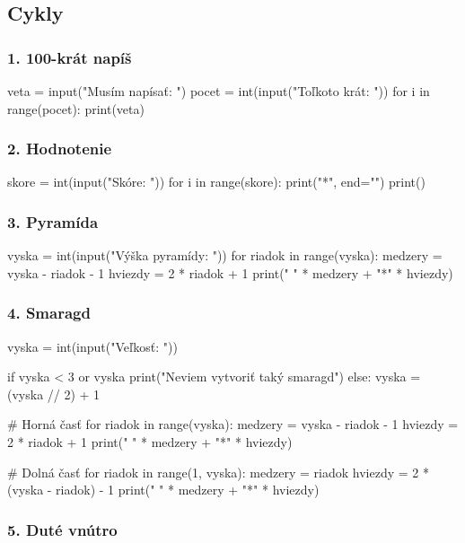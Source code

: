 \subsection{Cykly}

\subsubsection*{1. 100-krát napíš}
\begin{solution}
veta = input("Musím napísať: ")
pocet = int(input("Toľkoto krát: "))
for i in range(pocet):
    print(veta)
\end{solution}

\subsubsection*{2. Hodnotenie}
\begin{solution}
skore = int(input("Skóre: "))
for i in range(skore):
    print("*", end="")
print()
\end{solution}

\subsubsection*{3. Pyramída}
\begin{solution}
vyska = int(input("Výška pyramídy: "))
for riadok in range(vyska):
    medzery = vyska - riadok - 1
    hviezdy = 2 * riadok + 1
    print(" " * medzery + "*" * hviezdy)
\end{solution}

\subsubsection*{4. Smaragd}
\begin{solution}
vyska = int(input("Veľkosť: "))

if vyska < 3 or vyska %
    print("Neviem vytvoriť taký smaragd")
else:
    vyska = (vyska // 2) + 1

    # Horná časť
    for riadok in range(vyska):
        medzery = vyska - riadok - 1
        hviezdy = 2 * riadok + 1
        print(" " * medzery + "*" * hviezdy)

    # Dolná časť
    for riadok in range(1, vyska):
        medzery = riadok
        hviezdy = 2 * (vyska - riadok) - 1
        print(" " * medzery + "*" * hviezdy)
\end{solution}


\subsubsection*{5. Duté vnútro}

